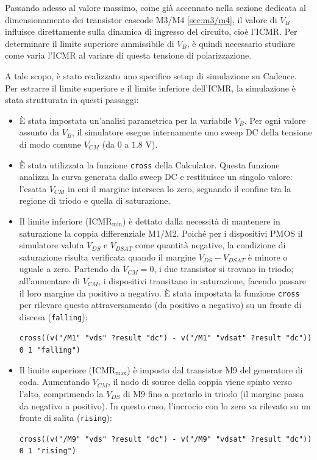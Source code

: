 \documentclass[12pt,a4paper,twoside]{report}
\begin{document}
Passando adesso al valore massimo, come già accennato nella sezione dedicata al dimensionamento dei transistor cascode M3/M4 \ref{sec:m3/m4}, il valore di $V_B$ influisce direttamente sulla dinamica di ingresso del circuito, cioè l'ICMR. Per determinare il limite superiore ammissibile di $V_B$, è quindi necessario studiare come varia l'ICMR al variare di questa tensione di polarizzazione.

A tale scopo, è stato realizzato uno specifico setup di simulazione su Cadence. Per estrarre il limite superiore e il limite inferiore dell'ICMR, la simulazione è stata strutturata in questi passaggi:

\begin{itemize}
    \item È stata impostata un'analisi parametrica per la variabile $V_B$. Per ogni valore assunto da $V_B$, il simulatore esegue internamente uno sweep DC della tensione di modo comune $V_{CM}$ (da $0$ a $1.8\text{ V}$).
    
    \item È stata utilizzata la funzione \texttt{cross} della Calculator. Questa funzione analizza la curva generata dallo sweep DC e restituisce un singolo valore: l'esatta $V_{CM}$ in cui il margine interseca lo zero, segnando il confine tra la regione di triodo e quella di saturazione.
    
    \item Il limite inferiore ($\mathrm{ICMR_{min}}$) è dettato dalla necessità di mantenere in saturazione la coppia differenziale M1/M2. Poiché per i dispositivi PMOS il simulatore valuta $V_{DS}$ e $V_{DSAT}$ come quantità negative, la condizione di saturazione risulta verificata quando il margine $V_{DS} - V_{DSAT}$ è minore o uguale a zero. Partendo da $V_{CM}=0$, i due transistor si trovano in triodo; all'aumentare di $V_{CM}$, i dispositivi transitano in saturazione, facendo passare il loro margine da positivo a negativo. È stata impostata la funzione \texttt{cross} per rilevare questo attraversamento (da positivo a negativo) su un fronte di discesa (\texttt{falling}):
    \begin{center}
        \texttt{cross((v("/M1" "vds" ?result "dc") - v("/M1" "vdsat" ?result "dc")) 0 1 "falling")}
    \end{center}

    \item Il limite superiore ($\mathrm{ICMR_{max}}$) è imposto dal transistor M9 del generatore di coda. Aumentando $V_{CM}$, il nodo di source della coppia viene spinto verso l'alto, comprimendo la $V_{DS}$ di M9 fino a portarlo in triodo (il margine passa da negativo a positivo). In questo caso, l'incrocio con lo zero va rilevato su un fronte di salita (\texttt{rising}):
    \begin{center}
        \texttt{cross((v("/M9" "vds" ?result "dc") - v("/M9" "vdsat" ?result "dc")) 0 1 "rising")}
    \end{center}
\end{itemize}
\end{document}
